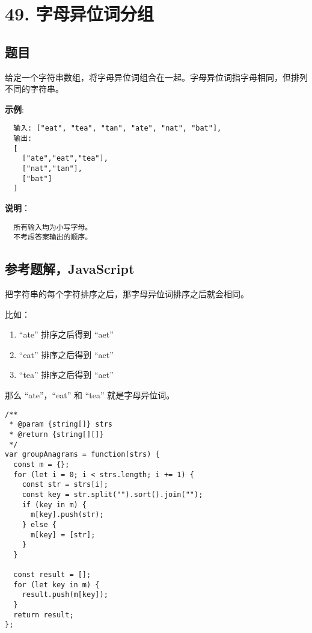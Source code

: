 \newpage
\section{49. 字母异位词分组}
\label{leetcode:49}

\subsection{题目}

给定一个字符串数组，将字母异位词组合在一起。字母异位词指字母相同，但排列不同的字符串。

\textbf{示例}:

\begin{verbatim}
  输入: ["eat", "tea", "tan", "ate", "nat", "bat"],
  输出:
  [
    ["ate","eat","tea"],
    ["nat","tan"],
    ["bat"]
  ]
\end{verbatim}

\textbf{说明}：

\begin{verbatim}
  所有输入均为小写字母。
  不考虑答案输出的顺序。
\end{verbatim}

\subsection{参考题解，JavaScript}

把字符串的每个字符排序之后，那字母异位词排序之后就会相同。

比如：

\begin{enumerate}
  \item ``ate'' 排序之后得到 ``aet''
  \item ``eat'' 排序之后得到 ``aet''
  \item ``tea'' 排序之后得到 ``aet''
\end{enumerate}

那么 ``ate''，``eat'' 和 ``tea'' 就是字母异位词。

\begin{verbatim}
/**
 * @param {string[]} strs
 * @return {string[][]}
 */
var groupAnagrams = function(strs) {
  const m = {};
  for (let i = 0; i < strs.length; i += 1) {
    const str = strs[i];
    const key = str.split("").sort().join("");
    if (key in m) {
      m[key].push(str);
    } else {
      m[key] = [str];
    }
  }

  const result = [];
  for (let key in m) {
    result.push(m[key]);
  }
  return result;
};
\end{verbatim}

